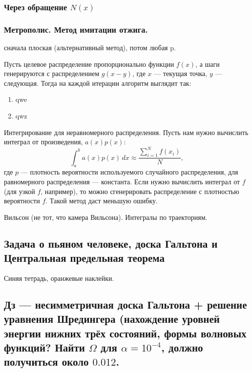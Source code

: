 \documentclass{book}
\begin{document}
\clearpage

\subsubsection{Через обращение $N(x)$}

\subsubsection{Метрополис. Метод имитации отжига.}

сначала плоская (альтернативный метод), потом любая p.

Пусть целевое распределение пропорционально функции $f(x)$, а шаги генерируются с распределением
$g(x - y)$, где $x$ --- текущая точка, $y$ --- следующая. Тогда на каждой итерации алгоритм
выглядит так:
\begin{enumerate}
    \item qwe
    \item qwz
\end{enumerate}

Интегрирование для неравномерного распределения. Пусть нам нужно вычислить интеграл от
произведения, $a(x) p(x)$:
\begin{equation}
    \int_a^b a(x) p(x) \, dx \approx \frac{\sum_{i=1}^N f(x_i)}{N},
\end{equation}
где $p$ --- плотность вероятности используемого случайного распределения, для равномерного
распределения --- константа. Если нужно вычислить интеграл от $f$ (для узкой $f$, например), то
можно сгенерировать распределение с плотностью вероятности $f$. Такой метод даст
меньшую ошибку.

Вильсон (не тот, что камера Вильсона). Интегралы по траекториям.

\subsection{Задача о пьяном человеке, доска Гальтона и Центральная предельная теорема}

Синяя тетрадь, оранжевые наклейки.

\subsection{Дз --- несимметричная доска Гальтона + решение уравнения Шредингера (нахождение уровней
энергии нижних трёх состояний, формы волновых функций? Найти $\Omega$ для $\alpha = 10^{-4}$,
должно получиться около $0.012$.}
\end{document}
